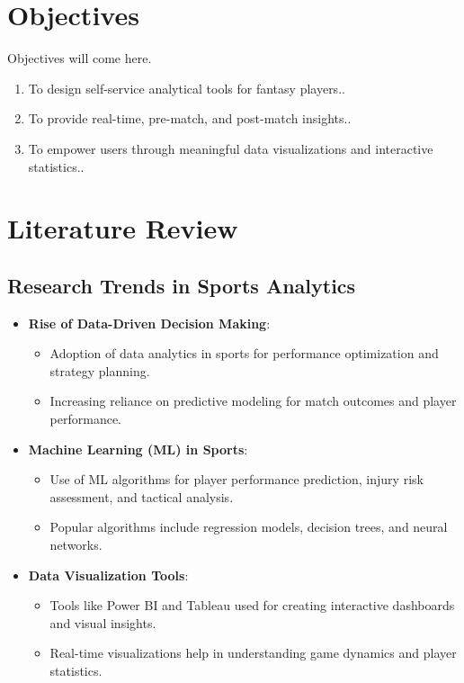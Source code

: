 \section{Objectives}
Objectives will come here.
\begin{enumerate}
	\item To design self-service analytical tools for fantasy players..
	
	\item To provide real-time, pre-match, and post-match insights.. 
	
    \item To empower users through meaningful data visualizations and interactive statistics..
\end{enumerate}

\section{Literature Review}

\subsection{Research Trends in Sports Analytics}
\begin{itemize}
    \item \textbf{Rise of Data-Driven Decision Making}:
    \begin{itemize}
        \item Adoption of data analytics in sports for performance optimization and strategy planning.
        \item Increasing reliance on predictive modeling for match outcomes and player performance.
    \end{itemize}
    \item \textbf{Machine Learning (ML) in Sports}:
    \begin{itemize}
        \item Use of ML algorithms for player performance prediction, injury risk assessment, and tactical analysis.
        \item Popular algorithms include regression models, decision trees, and neural networks.
    \end{itemize}
    \item \textbf{Data Visualization Tools}:
    \begin{itemize}
        \item Tools like Power BI and Tableau used for creating interactive dashboards and visual insights.
        \item Real-time visualizations help in understanding game dynamics and player statistics.
    \end{itemize}
\end{itemize}

